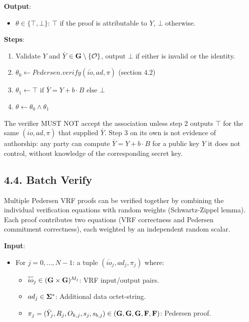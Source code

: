 \documentclass[
]{article}
\providecommand{\tightlist}{%
  \setlength{\itemsep}{0pt}\setlength{\parskip}{0pt}}
\begin{document}
\textbf{Output}:

\begin{itemize}
\tightlist
\item
  \(\theta \in \{ \top, \bot \}\): \(\top\) if the proof is attributable
  to \(Y\), \(\bot\) otherwise.
\end{itemize}

\textbf{Steps}:

\begin{enumerate}
\def\labelenumi{\arabic{enumi}.}
\tightlist
\item
  Validate \(Y\) and \(\bar{Y}\)
  \(\in \bold{G}\setminus \{\mathcal{O}\}\), output \(\bot\) if either
  is invalid or the identity.
\item
  \(\theta_0 \gets Pedersen.verify(\overline{io}, ad, \pi)\) (section
  4.2)
\item
  \(\theta_1 \gets \top \text{ if } \bar{Y} = Y + b \cdot B \text{ else } \bot\)
\item
  \(\theta \gets \theta_0 \land \theta_1\)
\end{enumerate}

The verifier MUST NOT accept the association unless step 2 outputs
\(\top\) for the same \((\overline{io}, ad, \pi)\) that supplied
\(\bar{Y}\). Step 3 on its own is not evidence of authorship: any party
can compute \(\bar{Y} = Y + b \cdot B\) for a public key \(Y\) it does
not control, without knowledge of the corresponding secret key.

\subsection{4.4. Batch Verify}\label{batch-verify-1}

Multiple Pedersen VRF proofs can be verified together by combining the
individual verification equations with random weights (Schwartz-Zippel
lemma). Each proof contributes two equations (VRF correctness and
Pedersen commitment correctness), each weighted by an independent random
scalar.

\textbf{Input}:

\begin{itemize}
\tightlist
\item
  For \(j = 0, \ldots, N-1\): a tuple \((\overline{io}_j, ad_j, \pi_j)\)
  where:

  \begin{itemize}
  \tightlist
  \item
    \(\overline{io}_j \in (\bold{G}\times \bold{G})^{M_j}\): VRF
    input/output pairs.
  \item
    \(ad_j \in \bold{\Sigma}^*\): Additional data octet-string.
  \item
    \(\pi_j = (\bar{Y}_j, R_j, O_{k,j}, s_j, s_{b,j}) \in (\bold{G}, \bold{G}, \bold{G}, \bold{F}, \bold{F})\):
    Pedersen proof.
  \end{itemize}
\end{itemize}
\end{document}
